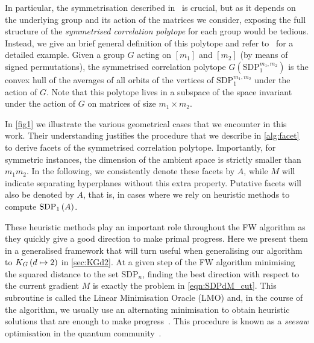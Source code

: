 \documentclass[10pt,aps,notitlepage,onecolumn,pra,superscriptaddress]{revtex4-1}
\newcommand\cut[2]{\mathrm{SDP}_{#1}^{#2}}
\newcommand\KG[2]{K_G\left({#1}\ifx#2\empty\else\mapsto\fi{#2}\right)}
\newcommand\sdp[2]{\mathrm{SDP}_{#1}\ifx#2\empty\else\left({#2}\right)\fi}
\begin{document}
In particular, the symmetrisation described in~\cite{DVP24} is crucial, but as it depends on the underlying group and its action of the matrices we consider, exposing the full structure of the \emph{symmetrised correlation polytope} for each group would be tedious.
Instead, we give an brief general definition of this polytope and refer to~\cite{DVP24} for a detailed example.
Given a group $G$ acting on $[m_1]$ and $[m_2]$ (by means of signed permutations), the symmetrised correlation polytope $G(\cut{1}{m_1,m_2})$ is the convex hull of the averages of all orbits of the vertices of $\cut{1}{m_1,m_2}$ under the action of $G$.
Note that this polytope lives in a subspace of the space invariant under the action of $G$ on matrices of size $m_1\times m_2$.

In \cref{fig1} we illustrate the various geometrical cases that we encounter in this work.
Their understanding justifies the procedure that we describe in \cref{alg:facet} to derive facets of the symmetrised correlation polytope. %
Importantly, for symmetric instances, the dimension of the ambient space is strictly smaller than $m_1m_2$.
In the following, we consistently denote these facets by $A$, while $M$ will indicate separating hyperplanes without this extra property.
Putative facets will also be denoted by $A$, that is, in cases where we rely on heuristic methods to compute $\sdp{1}{A}$.

These heuristic methods play an important role throughout the FW algorithm as they quickly give a good direction to make primal progress.
Here we present them in a generalised framework that will turn useful when generalising our algorithm to $\KG{d}{2}$ in \cref{sec:KGd2}.
At a given step of the FW algorithm minimising the squared distance to the set $\cut{n}{}$, finding the best direction with respect to the current gradient $M$ is exactly the problem in \cref{eqn:SDPdM_cut}.
This subroutine is called the Linear Minimisation Oracle (LMO) and, in the course of the algorithm, we usually use an alternating minimisation to obtain heuristic solutions that are enough to make progress~\cite[Appendix~B.1]{DIB+23}.
This procedure is known as a \emph{seesaw} optimisation in the quantum community~\cite{WW01}.
\end{document}
